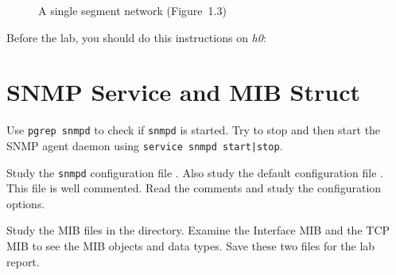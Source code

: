 \documentclass{../UTNetLab}
\begin{document}
\begin{center}
\begin{minipage}{0.48\textwidth}
\begin{flushright}
\begin{figure}[H]
                    \caption{A single segment network (Figure~1.3)}\label{fig:1.3}
                \end{figure}
            \end{flushright}
        \end{minipage}
    \end{center}

    Before the lab, you should do this instructions on \textit{h0}:

\section{SNMP Service and MIB Struct}
    Use \lstinline{pgrep snmpd} to check if \lstinline{snmpd} is started.
    Try to stop and then start the SNMP agent daemon using \lstinline{service snmpd start|stop}.

    Study the \lstinline{snmpd} configuration file .
    Also study the default configuration file .
    This file is well commented.
    Read the comments and study the configuration options.

    Study the MIB files in the  directory.
    Examine the Interface MIB  and the TCP MIB  to see the MIB objects and data types.
    Save these two files for the lab report.
\end{document}
